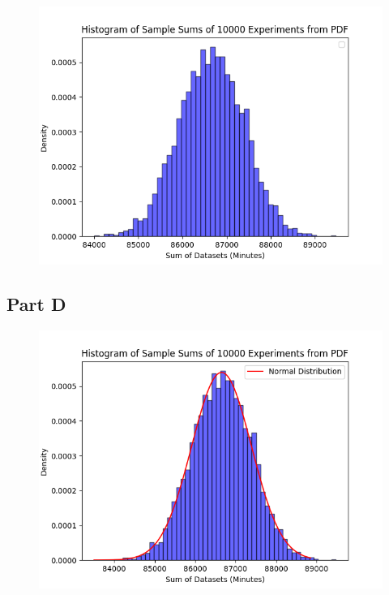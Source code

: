 \documentclass[]{report}
\begin{document}
			
			\begin{figure}[H]
				\centering
				\includegraphics[width=1\linewidth]{pics/4.c}
				\caption{}
				\label{fig:7}
			\end{figure}
		
		
		
		\subsection{Part D}
		
		
		\begin{figure}[H]
			\centering
			\includegraphics[width=1\linewidth]{pics/4.d}
			\caption{}
			\label{fig:8}
		\end{figure}
		
\end{document}
